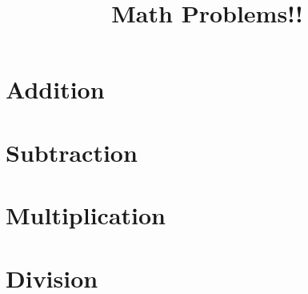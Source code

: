 \documentclass[14pt,article]{memoir}
\title{Math Problems!!}
\begin{document}
\maketitle



\section{Addition}



\section{Subtraction}



\section{Multiplication}



\section{Division}
\end{document}

